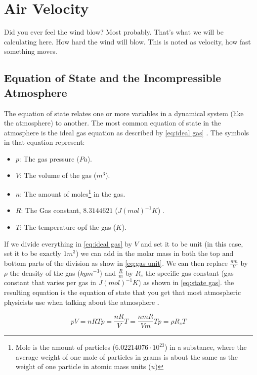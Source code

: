 \section{Air Velocity}
Did you ever feel the wind blow? Most probably. That's what we will be calculating here. How hard the wind will blow. This is noted as velocity, how fast something moves. 

\subsection{Equation of State and the Incompressible Atmosphere}
The equation of state relates one or more variables in a dynamical system (like the atmosphere) to another. The most common equation of state in the atmosphere is the ideal gas equation as 
described by \autoref{eq:ideal gas} \cite{idealGas}. The symbols in that equation represent:

\begin{itemize}
    \item $p$: The gas pressure ($Pa$).
    \item $V$: The volume of the gas ($m^3$).
    \item $n$: The amount of moles\footnote{Mole is the amount of particles ($6.02214076 \cdot 10^{23}$) in a substance, where the average weight of one mole of particles in grams is about the 
    same as the weight of one particle in atomic mass units ($u$)\cite{mole}} in the gas.
    \item $R$: The Gas constant, $8.3144621$ ($J(mol)^{-1}K$) \cite{idealGas}.
    \item $T$: The temperature opf the gas ($K$).
\end{itemize}

If we divide everything in \autoref{eq:ideal gas} by $V$ and set it to be unit (in this case, set it to be exactly $1 m^3$) we can add in the molar mass in both the top and bottom parts of the 
division as show in \autoref{eq:gas unit}. We can then replace $\frac{nm}{V}$ by $\rho$ the density of the gas ($kgm^{-3}$) and $\frac{R}{m}$ by $R_s$ the specific gas constant (gas constant that varies per 
gas in $J(mol)^{-1}K$) as shown in \autoref{eq:state gas}. the resulting equation is the equation of state that you get that most atmospheric physicists use when talking about the atmosphere \cite{simon}.

\begin{subequations}
    \begin{equation}
        pV = nRT
        \label{eq:ideal gas}
    \end{equation}
    \begin{equation}
        p = \frac{nR}{V}T = \frac{nmR}{Vm}T
        \label{eq:gas unit}
    \end{equation}
    \begin{equation}
        p = \rho R_sT
        \label{eq:state gas}
    \end{equation}
\end{subequations}

